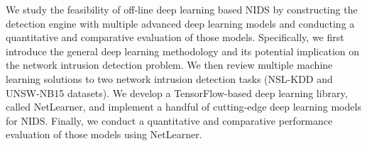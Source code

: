 We study the feasibility of off-line deep learning based NIDS by constructing the detection engine with
multiple advanced deep learning models and conducting a quantitative and comparative evaluation of those models.
Specifically, we first introduce the general deep learning methodology and its potential implication on the network intrusion detection problem.
We then review multiple machine learning solutions to two network intrusion detection tasks (NSL-KDD and UNSW-NB15 datasets).
We develop a TensorFlow-based deep learning library, called NetLearner, and implement a handful of cutting-edge deep learning models for NIDS.
Finally, we conduct a quantitative and comparative performance evaluation of those models using NetLearner.

